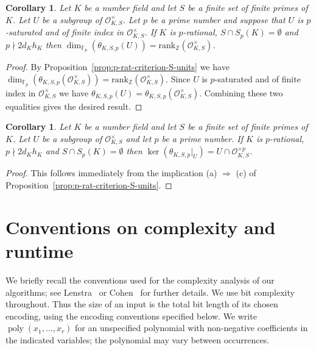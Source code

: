 \documentclass[12pt, a4paper, usenames]{amsart}
\newcommand{\Z}{\mathbb{Z}}
\newcommand{\F}{\mathbb{F}}
\theoremstyle{plain}
\newtheorem{corollary}[theorem]{Corollary}
\theoremstyle{remark}
\theoremstyle{definition}
\newcommand{\rank}{\mathrm{rank}}
\DeclareMathOperator{\poly}{poly}
\begin{document}
\begin{corollary}
    Let $K$ be a number field and let $S$ be a finite set of finite primes of $K$.
Let $U$ be a subgroup of $\mathcal{O}_{K,S}^{\times}$.
Let $p$ be a prime number and suppose that $U$ is $p$-saturated and of finite index in $\mathcal{O}_{K,S}^{\times}$.
If $K$ is $p$-rational, $S \cap S_{p}(K)=\emptyset$ and $p \nmid 2d_{K}h_{K}$
then $\dim_{\F_p}(\theta_{K,S,p}(U))=\rank_{\Z}(\mathcal{O}_{K,S}^{\times})$.
\end{corollary}

\begin{proof}
By Proposition~\ref{prop:p-rat-criterion-S-units} we have
$\dim_{\mathbb{F}_{p}}(\theta_{K,S,p}(\mathcal{O}_{K,S}^{\times})) = \rank_{\Z}(\mathcal{O}_{K,S}^{\times})$. 
Since $U$ is $p$-saturated and of finite index in $\mathcal{O}_{K,S}^{\times}$
we have $\theta_{K,S,p}(U)=\theta_{K,S,p}(\mathcal{O}_{K,S}^{\times})$.
Combining these two equalities gives the desired result. 
\end{proof}

\begin{corollary}\label{cor:ker-subgroup-of-S-units}
Let $K$ be a number field and let $S$ be a finite set of finite primes of $K$.
Let $U$ be a subgroup of $\mathcal{O}_{K,S}^{\times}$ and let $p$ be a prime number.
If $K$ is $p$-rational, $p \nmid 2d_{K}h_{K}$ and $S \cap S_{p}(K)=\emptyset$
then $\ker(\theta_{K,S,p} \vert_{U}) = U \cap \mathcal{O}_{K,S}^{\times p}$.
\end{corollary}

\begin{proof}
This follows immediately from the implication (a) $\Longrightarrow$ (c)
of Proposition~\ref{prop:p-rat-criterion-S-units}.
\end{proof}


\section{Conventions on complexity and runtime}\label{sec:coventions-comp-runtime}

We briefly recall the conventions used for the complexity analysis of our algorithms;
see Lenstra~\cite{MR1129315} or Cohen~\cite[\S{}1.1]{MR1228206} for further details.
We use bit complexity throughout.
Thus the size of an input is the total bit length of its chosen encoding, using the encoding conventions specified below.
We write $\poly(x_{1}, \ldots, x_{r})$ for an 
unspecified polynomial with non-negative coefficients in the indicated variables;
the polynomial may vary between occurrences.
\end{document}

